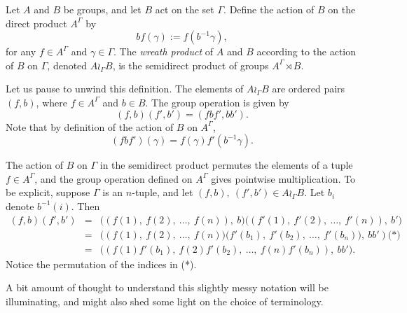 \documentclass[12pt]{article}
\theoremstyle{definition}
\theoremstyle{definition}
\theoremstyle{definition}
\begin{document}
Let $A$ and $B$ be groups, and let $B$ act on the set $\Gamma$.  
Define the action of $B$ on the direct product $A^{\Gamma}$ by
\[
b f(\gamma) := f(b^{-1}\gamma),
\]
for any $f\in A^{\Gamma}$ and $\gamma\in\Gamma$.
The \emph{wreath product} of $A$ and $B$ according to the action of $B$ on $\Gamma$, denoted $A\wr_{\Gamma} B$, is the semidirect product of groups $A^{\Gamma}\rtimes B$.

Let us pause to unwind this definition.  The elements of $A\wr_{\Gamma}B$ are ordered pairs $(f,b)$, where $f\in A^{\Gamma}$ and $b\in B$.  The group operation is given by
\[(f,b)(f',b') = (fbf', bb').\]
Note that by definition of the action of $B$ on $A^{\Gamma}$,
\[(fbf')(\gamma) = f(\gamma)f'(b^{-1}\gamma).\]

The action of $B$ on $\Gamma$ in the semidirect product permutes the elements of a tuple $f\in A^{\Gamma}$, and the group operation defined on $A^{\Gamma}$ gives pointwise multiplication.  To be explicit, suppose $\Gamma$ is an $n$-tuple, and let $(f,b),~(f',b')\in A\wr_{\Gamma} B$.  
Let $b_i$ denote $b^{-1}(i)$.  Then
\begin{eqnarray*}
(f,b)(f',b') &=& \bigl((f(1),~f(2),~\ldots,~f(n)),~b\bigr) \bigl((f'(1),~f'(2),~\ldots,~f'(n)),~b'\bigr) \\
               &=& \bigl((f(1),~f(2),~\ldots,~f(n)\bigr)\bigl(f'(b_1),~f'(b_2),~\ldots,~f'(b_n)\bigr),~bb') 
                       \text{(*)} \\
               &=& \bigl((f(1)f'(b_1),~f(2)f'(b_2),~\ldots,~f(n)f'(b_n)),~bb'\bigr).
\end{eqnarray*}
Notice the permutation of the indices in (*).

A bit amount of thought to understand this slightly messy notation will be illuminating, and might also shed some light on the choice of terminology.
\end{document}
